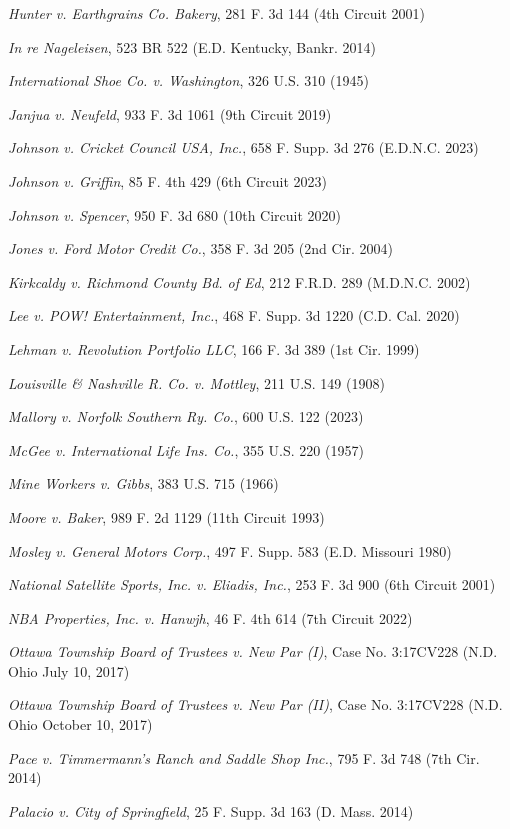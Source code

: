 \textit{Hunter v. Earthgrains Co. Bakery}, 281 F. 3d 144 (4th Circuit 2001)

\textit{In re Nageleisen}, 523 BR 522 (E.D. Kentucky, Bankr. 2014)

\textit{International Shoe Co. v. Washington}, 326 U.S. 310 (1945)

\textit{Janjua v. Neufeld}, 933 F. 3d 1061 (9th Circuit 2019)

\textit{Johnson v. Cricket Council USA, Inc.}, 658 F. Supp. 3d 276 (E.D.N.C. 2023)

\textit{Johnson v. Griffin}, 85 F. 4th 429 (6th Circuit 2023)

\textit{Johnson v. Spencer}, 950 F. 3d 680 (10th Circuit 2020)

\textit{Jones v. Ford Motor Credit Co.}, 358 F. 3d 205 (2nd Cir. 2004)

\textit{Kirkcaldy v. Richmond County Bd. of Ed}, 212 F.R.D. 289 (M.D.N.C. 2002)

\textit{Lee v. POW! Entertainment, Inc.}, 468 F. Supp. 3d 1220 (C.D. Cal. 2020)

\textit{Lehman v. Revolution Portfolio LLC}, 166 F. 3d 389 (1st Cir. 1999)

\textit{Louisville \& Nashville R. Co. v. Mottley}, 211 U.S. 149 (1908)

\textit{Mallory v. Norfolk Southern Ry. Co.}, 600 U.S. 122 (2023)

\textit{McGee v. International Life Ins. Co.}, 355 U.S. 220 (1957)

\textit{Mine Workers v. Gibbs}, 383 U.S. 715 (1966)

\textit{Moore v. Baker}, 989 F. 2d 1129 (11th Circuit 1993)

\textit{Mosley v. General Motors Corp.}, 497 F. Supp. 583 (E.D. Missouri 1980)

\textit{National Satellite Sports, Inc. v. Eliadis, Inc.}, 253 F. 3d 900 (6th Circuit 2001)

\textit{NBA Properties, Inc. v. Hanwjh}, 46 F. 4th 614 (7th Circuit 2022)

\textit{Ottawa Township Board of Trustees v. New Par (I)}, Case No. 3:17CV228 (N.D. Ohio July 10, 2017)

\textit{Ottawa Township Board of Trustees v. New Par (II)}, Case No. 3:17CV228 (N.D. Ohio October 10, 2017)

\textit{Pace v. Timmermann’s Ranch and Saddle Shop Inc.}, 795 F. 3d 748 (7th Cir. 2014)

\textit{Palacio v. City of Springfield}, 25 F. Supp. 3d 163 (D. Mass. 2014)

